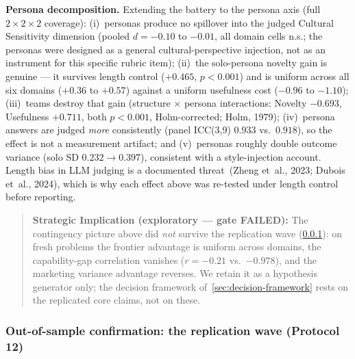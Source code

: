 \documentclass[12pt,a4paper]{article}
\begin{document}
\textbf{Persona decomposition.} Extending the battery to the persona axis
(full $2\times2\times2$ coverage): (i)~personas produce no spillover into the
judged Cultural Sensitivity dimension (pooled $d = -0.10$ to $-0.01$, all
domain cells n.s.; the personas were designed as a general cultural-perspective
injection, not as an instrument for this specific rubric item); (ii)~the
solo-persona novelty gain is genuine --- it survives length control
($+0.465$, $p < 0.001$) and is uniform across all six domains ($+0.36$ to
$+0.57$) against a uniform usefulness cost ($-0.96$ to $-1.10$); (iii)~teams
destroy that gain (structure $\times$ persona interactions: Novelty $-0.693$,
Usefulness $+0.711$, both $p < 0.001$, Holm-corrected; Holm, 1979);
(iv)~persona answers are judged \emph{more} consistently (panel ICC(3,9)
$0.933$ vs.\ $0.918$), so the effect is not a measurement artifact; and
(v)~personas roughly double outcome variance (solo SD $0.232 \to 0.397$),
consistent with a style-injection account. Length bias in LLM judging is a
documented threat~(Zheng et~al., 2023; Dubois et~al., 2024), which is why each
effect above was re-tested under length control before reporting.

\begin{quote}
\textbf{Strategic Implication (exploratory --- gate FAILED):} The contingency
picture above did \emph{not} survive the replication wave
(\cref{sec:wave}): on fresh problems the frontier advantage is uniform across
domains, the capability-gap correlation vanishes ($r = -0.21$ vs.\
$-0.978$), and the marketing variance advantage reverses. We retain it as a
hypothesis generator only; the decision framework
of~\cref{sec:decision-framework} rests on the replicated core claims, not on
these.
\end{quote}

\subsubsection{Out-of-sample confirmation: the replication wave (Protocol 12)}\label{sec:wave}
\end{document}
